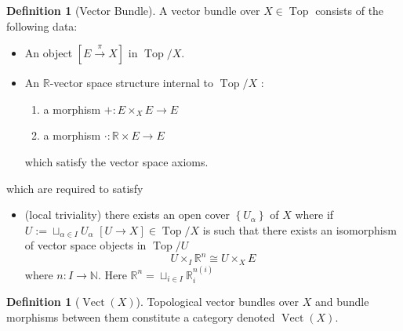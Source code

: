 \documentclass[reqno]{amsart}
\theoremstyle{definition}
\newtheorem{definition}[theorem]{Definition}
\theoremstyle{remark}
\DeclareMathOperator{\Vect}{Vect}
\DeclareMathOperator{\Top}{Top}
\begin{document}
    \begin{definition}[Vector Bundle]
       A vector bundle over
       $X \in \Top$ consists of the following data:
       \begin{itemize}
           \item An object
               $\left[ E \stackrel{\pi}{\to } X \right] $ 
               in $\Top / X$.
           \item An $\mathbb{R}$-vector space structure
               internal to $\Top / X$ :
               \begin{enumerate}
                   \item a morphism
                       $+ \colon
                       E \times_{X} E \to E$ 
                   \item a morphism $\cdot  \colon
                       \mathbb{R} \times E \to E$
               \end{enumerate}
               which satisfy the vector space axioms.
       \end{itemize}
       which are required to satisfy
       \begin{itemize}
           \item (local triviality) there exists
               an open cover $\left\{ U_{\alpha} \right\} $ 
               of $X$ where if
               $U := \sqcup_{\alpha \in I} U_{\alpha}$
               $\left[ U \to X \right] 
               \in \Top / X$ is such that
               there exists an isomorphism of vector
               space objects in $\Top /U$
               \[
               U \times_{I} \mathbb{R}^{n} 
               \cong U \times_{X} E
               \] 
               where $n \colon I \to \mathbb{N} $.
               Here $\mathbb{R}^{n}
               = \sqcup_{i \in I} \mathbb{R}_i^{n(i)}$
       \end{itemize}
    \end{definition}


    \begin{definition}[$\Vect(X)$]
        Topological vector bundles over $X$ and
        bundle morphisms between them
        constitute a category denoted
        $\Vect(X)$.
    \end{definition}
    
\end{document}
